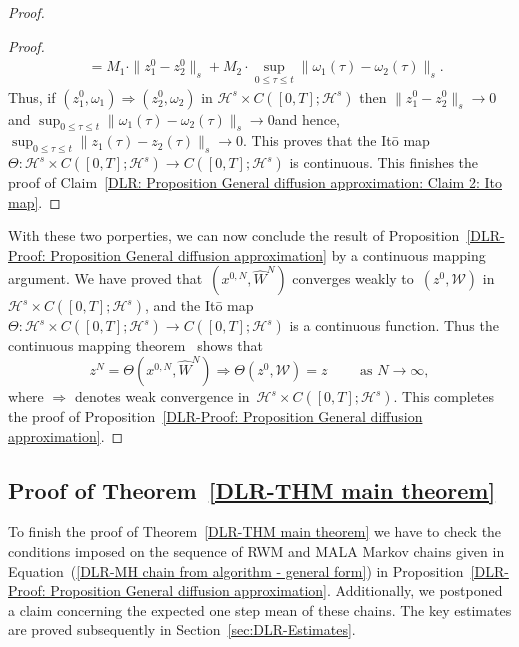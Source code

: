 \begin{proof}
\begin{proof}
\begin{align*}
      & = M_1 \cdot \| z_1^0 - z_2^0 \|_s + M_2 \cdot \sup_{0 \leq \tau \leq t}  \| \omega_1(\tau) - \omega_2(\tau) \|_s.
    \end{align*}
    Thus, if $(z^0_1, \omega_1) \Longrightarrow (z^0_2, \omega_2)$ in $\mathcal{H}^s \times C([0,T]; \mathcal{H}^s)$ then $\| z_1^0 - z_2^0 \|_s \to 0$ and $\sup_{0 \leq \tau \leq t}  \| \omega_1(\tau) - \omega_2(\tau) \|_s \to 0$and hence, $\sup_{0 \leq \tau \leq t} \| z_1(\tau) - z_2(\tau) \|_s \to 0$. This proves that the It\={o} map~$\Theta : \mathcal{H}^s \times C([0,T]; \mathcal{H}^s) \to  C([0,T]; \mathcal{H}^s)$ is continuous. This finishes the proof of Claim~\ref{DLR: Proposition General diffusion approximation: Claim 2: Ito map}.
     
  \end{proof}   
  
  With these two porperties, we can now conclude the result of Proposition~\ref{DLR-Proof: Proposition General diffusion approximation} by a continuous mapping argument. We have proved that~$(x^{0,N}, \widehat{W}^N)$ converges weakly to~$(z^0, \mathcal{W})$ in~$\mathcal{H}^s \times C([0,T];\mathcal{H}^s)$, and the It\={o} map~$\Theta : \mathcal{H}^s \times C([0,T]; \mathcal{H}^s) \to  C([0,T]; \mathcal{H}^s)$ is a continuous function. Thus the continuous mapping theorem~\autocite[Theorem 4.27]{Kallenberg2001} shows that
  \begin{equation*}
    z^N = \Theta (x^{0,N}, \widehat{W}^N) \Longrightarrow \Theta (z^0, \mathcal{W}) = z \qquad \text{  as } N \to \infty,
  \end{equation*}
  where $ \Longrightarrow$ denotes weak convergence in~$\mathcal{H}^s \times C([0,T]; \mathcal{H}^s)$. This completes the proof of Proposition~\ref{DLR-Proof: Proposition General diffusion approximation}.
  
   
\end{proof}


\subsection{Proof of Theorem~\ref{DLR-THM main theorem}}
\label{sec:sub:DLR-Proof}

To finish the proof of Theorem~\ref{DLR-THM main theorem} we have to check the conditions imposed on  the sequence of RWM and MALA Markov chains given in Equation~(\ref{DLR-MH chain from algorithm - general form}) in Proposition~\ref{DLR-Proof: Proposition General diffusion approximation}. Additionally, we postponed a claim concerning the expected one step mean of these chains. The key estimates are proved subsequently in Section~\ref{sec:DLR-Estimates}.

